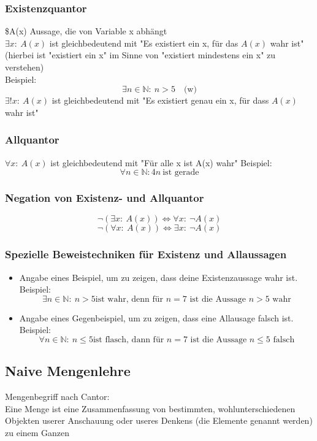 \documentclass[a4paper]{scrartcl}
\DeclareMathOperator{\Forall}{\forall}
\theoremstyle{definition}
\theoremstyle{plain}
\theoremstyle{plain}
\theoremstyle{remark}
\theoremstyle{remark}
\theoremstyle{remark}
\begin{document}
\subsubsection{Existenzquantor}
\label{sec-2-3-1}
\$A(x) Aussage, die von Variable x abhängt \\
    $\exists x:~A(x)$ ist gleichbedeutend mit "Es existiert ein x, für das $A(x)$ wahr ist" (hierbei ist "existiert ein x" im Sinne von "existiert mindestens ein x" zu verstehen) \\
    Beispiel:
\[\exists n\in\mathbb{N}:~n>5\quad\text{(w)}\]
$\exists !x:~A(x)$ ist gleichbedeutend mit "Es existiert genau ein x, für dass $A(x)$ wahr ist"
\subsubsection{Allquantor}
\label{sec-2-3-2}
$\Forall x:~A(x)$ ist gleichbedeutend mit "Für alle x ist A(x) wahr"
Beispiel:
\[\Forall n\in\mathbb{N}: 4n~\text{ist gerade}\]
\subsubsection{Negation von Existenz- und Allquantor}
\label{sec-2-3-3}
\[\neg(\exists x:~A(x)) \Leftrightarrow \Forall x:~\neg A(x)\]
\[\neg(\Forall x:~A(x)) \Leftrightarrow \exists x:~\neg A(x)\]
\subsubsection{Spezielle Beweistechniken für Existenz und Allaussagen}
\label{sec-2-3-4}
\begin{itemize}
\item Angabe eines Beispiel, um zu zeigen, dass deine Existenzaussage wahr ist. \\
      Beispiel:
\[\exists n\in\mathbb{N}:~n>5 \text{ist wahr, denn für $n = 7$ ist die Aussage $n > 5$ wahr}\]
\item Angabe eines Gegenbeispiel, um zu zeigen, dass eine Allausage falsch ist. \\
      Beispiel:
\[\Forall n\in\mathbb{N}:~n\leq 5 \text{ist flasch, dann für $n=7$ ist die Aussage $n\leq 5$ falsch}\]
\end{itemize}
\subsection{Naive Mengenlehre}
\label{sec-2-4}
Mengenbegriff nach Cantor: \\
   Eine Menge ist eine Zusammenfassung von bestimmten, wohlunterschiedenen Objekten userer Anschauung oder useres Denkens (die Elemente genannt werden) zu einem Ganzen
\end{document}
